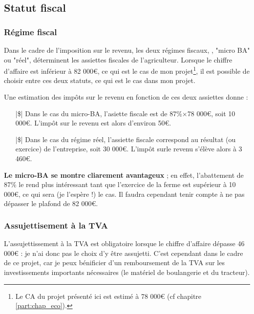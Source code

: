 \documentclass{book}
\begin{document}
\subsection{Statut fiscal}

\subsubsection{Régime fiscal}

Dans le cadre de l'imposition sur le revenu, les deux régimes fiscaux, , "micro BA" ou "réel", déterminent les assiettes fiscales de l'agriculteur. Lorsque le chiffre d'affaire est inférieur à 82 000\euro{}, ce qui est le cas de mon projet\footnote{Le CA du projet présenté ici est estimé à 78 000\euro{} (cf chapitre \ref{part:chap_eco}).}, il est possible de choisir entre ces deux statuts, ce qui est le cas dans mon projet.

Une estimation des impôts sur le revenu en fonction de ces deux assiettes donne : 
\begin{itemize}

\item[|\$|] Dans le cas du micro-BA, l'asiette fiscale est de 87\%$\times$78 000\euro{}, soit 10 000\euro{}. L'impôt sur le revenu est alors d'environ 50\euro{}.

\item[|\$|] Dans le cas du régime réel, l'assiette fiscale correspond au résultat (ou exercice) de l'entreprise, soit 30 000\euro{}. L'impôt surle revenu s'élève alors à 3 460\euro{}.

\end{itemize}

\textbf{Le micro-BA se montre cliarement avantageux} ; en effet, l'abattement de 87\% le rend plus intéressant tant que l'exercice de la ferme est supérieur à 10 000\euro{}, ce qui sera (je l'espère !) le cas. Il faudra cependant tenir compte à ne pas dépasser le plafond de 82 000\euro{}. 

\subsubsection{Assujettisement à la TVA}

L'assujettissement à la TVA est obligatoire lorsque le chiffre d'affaire dépasse 46 000\euro{} : je n'ai donc pas le choix d'y être assujetti. C'est cependant dans le cadre de ce projet, car je peux bénificier d'un remboursement de la TVA sur les investissements importants nécessaires (le matériel de boulangerie et du tracteur). 
\end{document}

